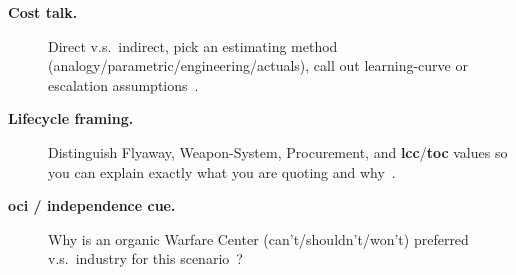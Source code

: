 \documentclass[../main.tex]{subfiles}
\begin{document}
\begin{description}
  \item[\textbf{Cost talk.}] Direct v.s.\ indirect, pick an estimating method (analogy/parametric/engineering/actuals), call out learning-curve or escalation assumptions~\autocite{DAU-AAF,FAR}.
  \item[\textbf{Lifecycle framing.}] Distinguish Flyaway, Weapon-System, Procurement, and \textbf{\ac{lcc}}/\textbf{\ac{toc}} values so you can explain exactly what you are quoting and why~\autocite{DoDI5000-85,SECNAV5000-2G}.
  \item[\textbf{\ac{oci} / independence cue.}] Why is an organic Warfare Center (can't/shouldn't/won't) preferred v.s.\ industry for this scenario~\autocite{SECNAV5400-15D}?
\end{description}
\end{document}
